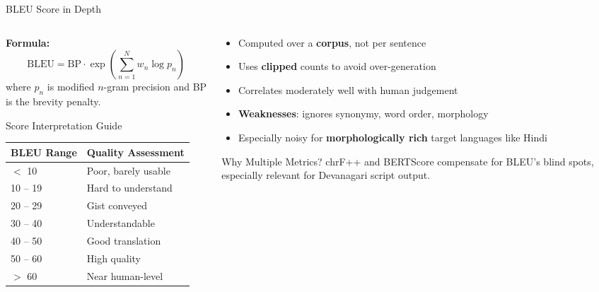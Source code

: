\documentclass[aspectratio=169]{beamer}
\begin{document}
\begin{frame}{BLEU Score in Depth}
  \begin{columns}[T]
    \begin{column}{0.55\textwidth}
      \textbf{Formula:}
      \[
        \text{BLEU} = \text{BP} \cdot \exp\!\left(\sum_{n=1}^{N} w_n \log p_n\right)
      \]
      where $p_n$ is modified $n$-gram precision and BP is the brevity penalty.
      \vspace{0.3cm}
      \begin{block}{Score Interpretation Guide}
        \begin{tabular}{ll}
          \toprule
          \textbf{BLEU Range} & \textbf{Quality Assessment} \\
          \midrule
          $<$ 10 & Poor, barely usable \\
          10 -- 19 & Hard to understand \\
          20 -- 29 & Gist conveyed \\
          30 -- 40 & Understandable \\
          40 -- 50 & Good translation \\
          50 -- 60 & High quality \\
          $>$ 60 & Near human-level \\
          \bottomrule
        \end{tabular}
      \end{block}
    \end{column}
    \begin{column}{0.42\textwidth}
      \begin{itemize}
        \item Computed over a \textbf{corpus}, not per sentence
        \item Uses \textbf{clipped} counts to avoid over-generation
        \item Correlates moderately well with human judgement
        \item \textbf{Weaknesses}: ignores synonymy, word order, morphology
        \item Especially noisy for \textbf{morphologically rich} target languages like Hindi
      \end{itemize}
      \vspace{0.3cm}
      \begin{block}{Why Multiple Metrics?}
        chrF++ and BERTScore compensate for BLEU's blind spots, especially relevant for Devanagari script output.
      \end{block}
    \end{column}
  \end{columns}
\end{frame}
\end{document}
